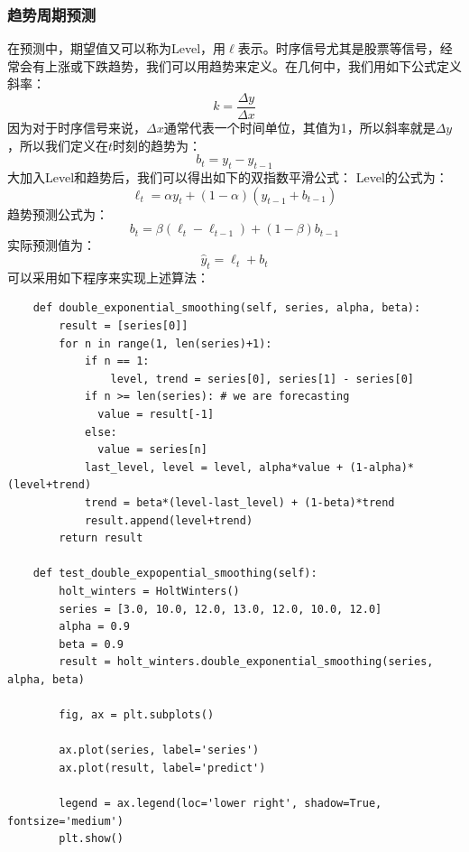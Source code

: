 \documentclass{article}
\begin{document}
\subsubsection{趋势周期预测}
在预测中，期望值又可以称为Level，用$\ell$表示。时序信号尤其是股票等信号，经常会有上涨或下跌趋势，我们可以用趋势来定义。在几何中，我们用如下公式定义斜率：
\begin{equation}
k=\frac{\Delta y}{\Delta x}
\label{e000094}
\end{equation}
因为对于时序信号来说，$\Delta x$通常代表一个时间单位，其值为1，所以斜率就是$\Delta y$，所以我们定义在$t$时刻的趋势为：
\begin{equation}
b_{t}=y_{t}-y_{t-1}
\label{e000095}
\end{equation}
大加入Level和趋势后，我们可以得出如下的双指数平滑公式：
Level的公式为：
\begin{equation}
\ell _{t} = \alpha y_{t} + (1-\alpha)(y_{t-1} + b_{t-1})
\label{e000096}
\end{equation}
趋势预测公式为：
\begin{equation}
b_{t} = \beta (\ell _{t} - \ell _{t-1}) + (1-\beta)b_{t-1}
\label{e000097}
\end{equation}
实际预测值为：
\begin{equation}
\hat{y}_{t}=\ell _{t} + b_{t}
\label{e000098}
\end{equation}
可以采用如下程序来实现上述算法：
\begin{lstlisting}
    def double_exponential_smoothing(self, series, alpha, beta):
        result = [series[0]]
        for n in range(1, len(series)+1):
            if n == 1:
                level, trend = series[0], series[1] - series[0]
            if n >= len(series): # we are forecasting
              value = result[-1]
            else:
              value = series[n]
            last_level, level = level, alpha*value + (1-alpha)*(level+trend)
            trend = beta*(level-last_level) + (1-beta)*trend
            result.append(level+trend)
        return result
        
    def test_double_expopential_smoothing(self):
        holt_winters = HoltWinters()
        series = [3.0, 10.0, 12.0, 13.0, 12.0, 10.0, 12.0]
        alpha = 0.9
        beta = 0.9
        result = holt_winters.double_exponential_smoothing(series, alpha, beta)
        
        fig, ax = plt.subplots()
        
        ax.plot(series, label='series')
        ax.plot(result, label='predict')
        
        legend = ax.legend(loc='lower right', shadow=True, fontsize='medium')
        plt.show()        
\end{lstlisting}
\end{document}
